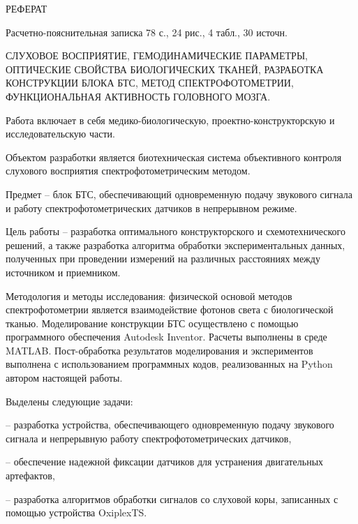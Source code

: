 \newpage
\begin{center}
РЕФЕРАТ
\end{center}
\vspace{6mm}

Расчетно-пояснительная записка 78 с., 24 рис., 4 табл., 30 источн. 

СЛУХОВОЕ ВОСПРИЯТИЕ, ГЕМОДИНАМИЧЕСКИЕ ПАРАМЕТРЫ, ОПТИЧЕСКИЕ СВОЙСТВА БИОЛОГИЧЕСКИХ ТКАНЕЙ, РАЗРАБОТКА КОНСТРУКЦИИ БЛОКА БТС, МЕТОД СПЕКТРОФОТОМЕТРИИ, ФУНКЦИОНАЛЬНАЯ АКТИВНОСТЬ ГОЛОВНОГО МОЗГА.

Работа включает в себя медико-биологическую, проектно-конструкторскую и исследовательскую части.

Объектом разработки является биотехническая система объективного контроля слухового восприятия спектрофотометрическим методом.

Предмет – блок БТС, обеспечивающий одновременную подачу звукового сигнала и работу спектрофотометрических датчиков в непрерывном режиме.

Цель работы – разработка оптимального конструкторского и схемотехнического решений, а также разработка алгоритма обработки экспериментальных данных, полученных при проведении измерений на различных расстояниях между источником и приемником.

Методология и методы исследования: физической основой методов спектрофотометрии является взаимодействие фотонов света с биологической тканью. Моделирование конструкции БТС осуществлено с помощью программного обеспечения Autodesk Inventor. 
Расчеты выполнены в среде MATLAB. Пост-обработка результатов моделирования и экспериментов выполнена с использованием программных кодов, реализованных на Python автором настоящей работы.

Выделены следующие задачи:

– разработка устройства, обеспечивающего одновременную подачу звукового сигнала и непрерывную работу спектрофотометрических датчиков,

– обеспечение надежной фиксации датчиков для устранения двигательных артефактов,

– разработка алгоритмов обработки сигналов со слуховой коры, записанных с помощью устройства OxiplexTS.











